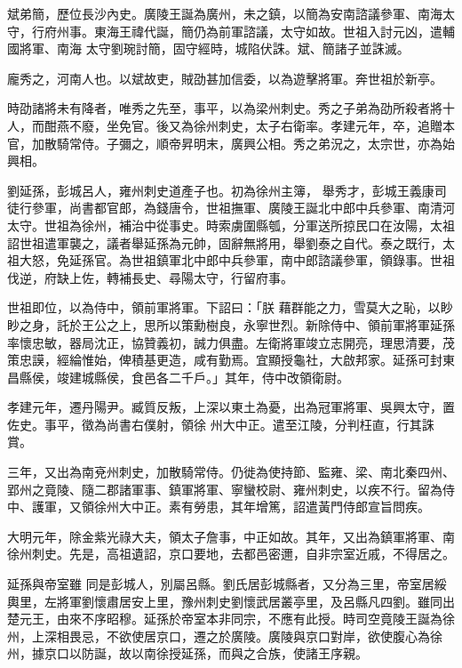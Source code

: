 \begin{pinyinscope}
 斌弟簡，歷位長沙內史。廣陵王誕為廣州，未之鎮，以簡為安南諮議參軍、南海太守，行府州事。東海王禕代誕，簡仍為前軍諮議，太守如故。世祖入討元凶，遣輔國將軍、南海
 太守劉琬討簡，固守經時，城陷伏誅。斌、簡諸子並誅滅。



 龐秀之，河南人也。以斌故吏，賊劭甚加信委，以為遊擊將軍。奔世祖於新亭。



 時劭諸將未有降者，唯秀之先至，事平，以為梁州刺史。秀之子弟為劭所殺者將十人，而酣燕不廢，坐免官。後又為徐州刺史，太子右衛率。孝建元年，卒，追贈本官，加散騎常侍。子彌之，順帝昇明末，廣興公相。秀之弟況之，太宗世，亦為始興相。



 劉延孫，彭城呂人，雍州刺史道產子也。初為徐州主簿，
 舉秀才，彭城王義康司徒行參軍，尚書都官郎，為錢唐令，世祖撫軍、廣陵王誕北中郎中兵參軍、南清河太守。世祖為徐州，補治中從事史。時索虜圍縣瓠，分軍送所掠民口在汝陽，太祖詔世祖遣軍襲之，議者舉延孫為元帥，固辭無將用，舉劉泰之自代。泰之既行，太祖大怒，免延孫官。為世祖鎮軍北中郎中兵參軍，南中郎諮議參軍，領錄事。世祖伐逆，府缺上佐，轉補長史、尋陽太守，行留府事。



 世祖即位，以為侍中，領前軍將軍。下詔曰：「朕
 藉群能之力，雪莫大之恥，以眇眇之身，託於王公之上，思所以策勳樹良，永寧世烈。新除侍中、領前軍將軍延孫率懷忠敏，器局沈正，協贊義初，誠力俱盡。左衛將軍竣立志開亮，理思清要，茂策忠謨，經綸惟始，俾積基更造，咸有勤焉。宜顯授龜社，大啟邦家。延孫可封東昌縣侯，竣建城縣侯，食邑各二千戶。」其年，侍中改領衛尉。



 孝建元年，遷丹陽尹。臧質反叛，上深以東土為憂，出為冠軍將軍、吳興太守，置佐史。事平，徵為尚書右僕射，領徐
 州大中正。遣至江陵，分判枉直，行其誅賞。



 三年，又出為南兗州刺史，加散騎常侍。仍徙為使持節、監雍、梁、南北秦四州、郢州之竟陵、隨二郡諸軍事、鎮軍將軍、寧蠻校尉、雍州刺史，以疾不行。留為侍中、護軍，又領徐州大中正。素有勞患，其年增篤，詔遣黃門侍郎宣旨問疾。



 大明元年，除金紫光祿大夫，領太子詹事，中正如故。其年，又出為鎮軍將軍、南徐州刺史。先是，高祖遺詔，京口要地，去都邑密邇，自非宗室近戚，不得居之。



 延孫與帝室雖
 同是彭城人，別屬呂縣。劉氏居彭城縣者，又分為三里，帝室居綏輿里，左將軍劉懷肅居安上里，豫州刺史劉懷武居叢亭里，及呂縣凡四劉。雖同出楚元王，由來不序昭穆。延孫於帝室本非同宗，不應有此授。時司空竟陵王誕為徐州，上深相畏忌，不欲使居京口，遷之於廣陵。廣陵與京口對岸，欲使腹心為徐州，據京口以防誕，故以南徐授延孫，而與之合族，使諸王序親。




\end{pinyinscope}
